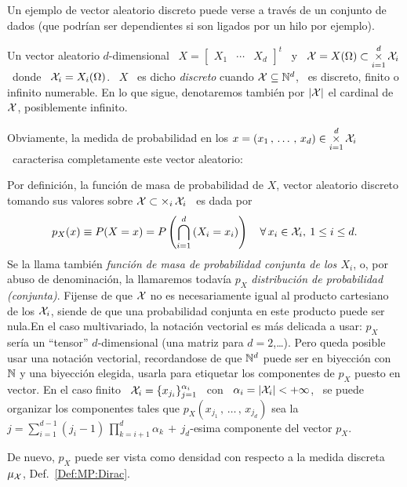 
\label{Ssec:MP:VecDiscreto}

Un ejemplo de vector aleatorio discreto puede verse a trav\'es de un conjunto de
dados (que podr\'ian  ser dependientes si son ligados por  un hilo por ejemplo).

\begin{definicion}
  Un  vector aleatorio $d$-dimensional  \ $X  = \begin{bmatrix}  X_1 &  \cdots &
    X_d  \end{bmatrix}^t$   \  y  \   $\displaystyle  \mathcal{X}  =   X(\Omega)  \subset
  \operatorname*{\times}_{i=1}^d \mathcal{X}_i$ \  donde \ $\mathcal{X}_i = X_i(\Omega)$. \ $X$  \ es dicho {\it
    discreto} cuando  $\mathcal{X} \subseteq \mathbb{N}^d$,  \ es discreto, finito  o infinito
  numerable.  En lo  que sigue, denotaremos tambi\'en por  $|\mathcal{X}|$ el cardinal de
  $\mathcal{X}$, posiblemente infinito.
\end{definicion}

Obviamente, la  medida de probabilidad  en los $\displaystyle  x = (x_1 \,  , \,
\ldots \, , \, x_d)  \in \operatorname*{\times}_{i=1}^d \mathcal{X}_i$ \ caracterisa completamente este
vector aleatorio:
%
\begin{definicion}
  Por  definici\'on,  la  funci\'on  de  masa de  probabilidad  de  $X$,  vector
  aleatorio discreto tomando sus valores sobre $\mathcal{X} \subset \operatorname*{\times}_i \mathcal{X}_i$ \ es
  dada por
  \[
  p_X(x) \equiv  P(X =  x) =  P\left( \bigcap_{i=1}^d \left(  X_i =  x_i \right)
  \right) \quad \forall \, x_i \in \mathcal{X}_i, \: 1 \le i \le d.
  \]
  Se la llama  tambi\'en {\it funci\'on de masa de  probabilidad conjunta de los
    $X_i$}, o, por  abuso de denominaci\'on, la llamaremos  todav\'ia $p_X$ {\it
    distribuci\'on  de probabilidad  (conjunta)}.   Fijense de  que  $\mathcal{X}$ no  es
  necesariamente igual al  producto cartesiano de los $\mathcal{X}_i$,  siende de que una
  probabilidad  conjunta en  este producto  puede ser  nula.\newline En  el caso
  multivariado, la notaci\'on vectorial es  m\'as delicada a usar: $p_X$ ser\'ia
  un ``tensor''  $d$-dimensional (una matriz  para $d = 2$,\ldots).   Pero queda
  posible usar una notaci\'on vectorial, recordandose de que $\mathbb{N}^d$ puede ser
  en biyecci\'on  con $\mathbb{N}$ y  una biyecci\'on elegida, usarla  para etiquetar
  los componentes  de $p_X$ puesto en  vector.  En el  caso finito \ $\mathcal{X}_i  = \{
  x_{j_i} \}_{j=1}^{\alpha_i}$ \ con \ $\alpha_i = |\mathcal{X}_i| < +\infty$, \ se puede
  organizar  los  componentes tales  que  $p_X(x_{j_1}\, ,  \,  \ldots  \, ,  \,
  x_{j_d})$  sea   la  $\displaystyle  j   =  \sum_{i=1}^{d-1}  (j_i  -   1)  \,
  \prod_{k=i+1}^d \alpha_k \, + \, j_d$-esima componente del vector $p_X$.
\end{definicion}
%
\noindent De nuevo, $p_X$ puede ser  vista como densidad con respecto a la medida
discreta $\mu_{\mathcal{X}}$, Def.~\ref{Def:MP:Dirac}.


